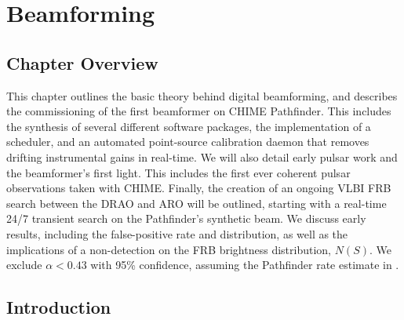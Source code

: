 \chapter{Beamforming}
\label{chapter:beamforming}



\section{Chapter Overview}

This chapter outlines the basic theory behind 
digital beamforming, and describes the commissioning 
of the first beamformer on CHIME Pathfinder. This 
includes the synthesis of several different software packages, 
the implementation of a scheduler, 
and an automated point-source calibration daemon that 
removes drifting instrumental gains in real-time. We will 
also detail early pulsar work and the beamformer's first light. 
This includes the first ever coherent pulsar observations 
taken with CHIME. 
Finally, the creation of an ongoing VLBI FRB search between 
the DRAO and ARO will be outlined, starting with a real-time 
24/7 transient search on the Pathfinder's synthetic beam. We discuss early 
results, including the false-positive rate and distribution, as 
well as the implications of a non-detection on the FRB brightness 
distribution, $N(S)$. We exclude $\alpha < 0.43$ with 95\% confidence, 
assuming the Pathfinder rate estimate in \citet{2016MNRAS.460.1054C}.

\section{Introduction}

